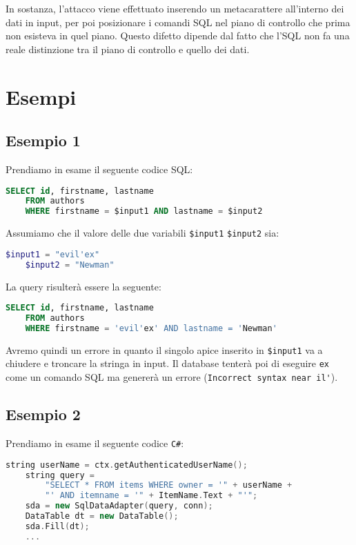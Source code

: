 In sostanza, l'attacco viene effettuato inserendo un metacarattere all'interno
dei dati in input, per poi
posizionare i comandi SQL nel piano di controllo che prima non esisteva in quel
piano.
Questo difetto dipende dal fatto che l'SQL non fa una reale distinzione tra il
piano di controllo
e quello dei dati.

\section{Esempi}

\subsection{Esempio 1}

Prendiamo in esame il seguente codice SQL:

\begin{lstlisting}[language=Sql]
    SELECT id, firstname, lastname
    FROM authors
    WHERE firstname = $input1 AND lastname = $input2
\end{lstlisting}

Assumiamo che il valore delle due variabili \verb|$input1| \verb|$input2|
sia:

\begin{lstlisting}[language=PHP]
    $input1 = "evil'ex"
    $input2 = "Newman"
\end{lstlisting}

La query risulterà essere la seguente:

\begin{lstlisting}[language=Sql]
    SELECT id, firstname, lastname
    FROM authors
    WHERE firstname = 'evil'ex' AND lastname = 'Newman'
\end{lstlisting}

Avremo quindi un errore in quanto il singolo apice inserito in \verb|$input1| va a chiudere e troncare la stringa in input. Il database tenterà poi di eseguire \verb|ex| come un comando SQL ma genererà un errore (\verb|Incorrect syntax near il'|).

\newpage

\subsection{Esempio 2}

Prendiamo in esame il seguente codice \verb|C#|:

\begin{lstlisting}[language=C++]
    string userName = ctx.getAuthenticatedUserName();
    string query = 
        "SELECT * FROM items WHERE owner = '" + userName + 
        "' AND itemname = '" + ItemName.Text + "'";
    sda = new SqlDataAdapter(query, conn);
    DataTable dt = new DataTable();
    sda.Fill(dt);
    ...
\end{lstlisting}

